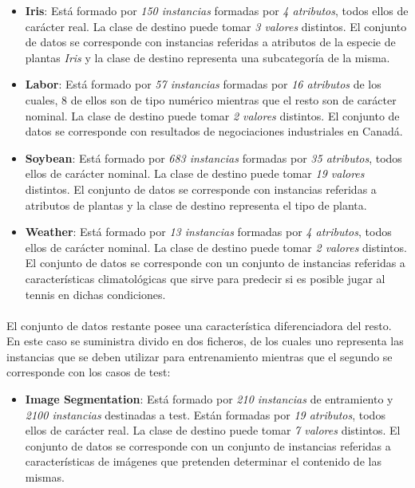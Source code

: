 \documentclass{article}
\begin{document}
			\begin{itemize}

				\item \textbf{Iris}\cite{dataset:iris}: Está formado por \emph{150 instancias} formadas por \emph{4 atributos}, todos ellos de carácter real. La clase de destino puede tomar \emph{3 valores} distintos. El conjunto de datos se corresponde con instancias referidas a atributos de la especie de plantas \emph{Iris} y la clase de destino representa una subcategoría de la misma.

				\item \textbf{Labor}\cite{dataset:labor}: Está formado por \emph{57 instancias} formadas por \emph{16 atributos} de los cuales, 8 de ellos son de tipo numérico mientras que el resto son de carácter nominal. La clase de destino puede tomar \emph{2 valores} distintos. El conjunto de datos se corresponde con resultados de negociaciones industriales en Canadá.

				\item \textbf{Soybean}\cite{dataset:soybean}: Está formado por \emph{683 instancias} formadas por \emph{35 atributos}, todos ellos de carácter nominal. La clase de destino puede tomar \emph{19 valores} distintos. El conjunto de datos se corresponde con instancias referidas a atributos de plantas y la clase de destino representa el tipo de planta.

				\item	\textbf{Weather}\cite{dataset:weather}: Está formado por \emph{13 instancias} formadas por \emph{4 atributos}, todos ellos de carácter nominal. La clase de destino puede tomar \emph{2 valores} distintos. El conjunto de datos se corresponde con un conjunto de instancias referidas a características climatológicas que sirve para predecir si es posible jugar al tennis en dichas condiciones.

			\end{itemize}

			\paragraph{}
			El conjunto de datos restante posee una característica diferenciadora del resto. En este caso se suministra divido en dos ficheros, de los cuales uno representa las instancias que se deben utilizar para entrenamiento mientras que el segundo se corresponde con los casos de test:

			\begin{itemize}

				\item	\textbf{Image Segmentation}\cite{dataset:segmentation}: Está formado por \emph{210 instancias} de entramiento y \emph{2100 instancias} destinadas a test. Están formadas por \emph{19 atributos}, todos ellos de carácter real. La clase de destino puede tomar \emph{7 valores} distintos. El conjunto de datos se corresponde con un conjunto de instancias referidas a características de imágenes que pretenden determinar el contenido de las mismas.

			\end{itemize}
\end{document}
